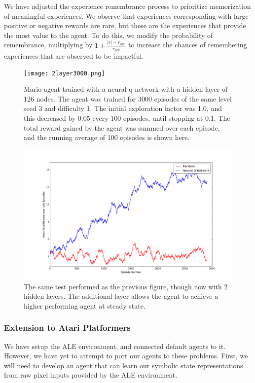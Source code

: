 \documentclass{article}
\begin{document}
We have adjusted the experience remembrance process to prioritize memorization of meaningful experiences. We observe that experiences corresponding with large positive or negative rewards are rare, but these are the experiences that provide the most value to the agent. To do this, we modify the probability of remembrance, multiplying by $1 + \frac{|r| - r_{ave}}{r_{dev}}$ to increase the chances of remembering experiences that are observed to be impactful.

 \begin{figure}
 \begin{center}
\texttt{[image: 2layer3000.png]}
\caption{Mario agent trained with a neural q-network with a hidden layer of 126 nodes. The agent was trained for 3000 episodes of the same level seed 3 and difficulty 1. The initial exploration factor was 1.0, and this decreased by 0.05 every 100 episodes, until stopping at 0.1. The total reward gained by the agent was summed over each episode, and the running average of 100 episodes is shown here.}
\includegraphics[scale=0.25]{layer2_126_550144_3000.png}
\caption{The same test performed as the previous figure, though now with 2 hidden layers. The additional layer allows the agent to achieve a higher performing agent at steady state.}
\end{center}
\end{figure}

\subsubsection{Extension to Atari Platformers}
We have setup the ALE environment, and connected default agents to it. However, we have yet to attempt to port our agents to these problems. First, we will need to develop an agent that can learn our symbolic state representations from raw pixel inputs provided by the ALE environment.
 
\end{document}
